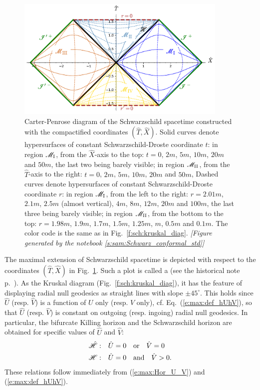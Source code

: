 \begin{figure}
\centerline{\includegraphics[width=0.9\textwidth]{max_carter-penrose-std.pdf}}
\caption[]{\label{f:max:carter-penrose-std} \footnotesize
Carter-Penrose diagram of the Schwarzschild spacetime
constructed with the compactified coordinates $(\hat{T},\hat{X})$.
Solid curves denote hypersurfaces of constant Schwarzschild-Droste coordinate
$t$: in region $\mathscr{M}_{\rm I}$, from the $\hat{X}$-axis to the top: $t=0$, $2m$,
$5m$, $10m$, $20m$ and $50m$, the last two being barely visible;
in region $\mathscr{M}_{\rm II}$, from the $\hat{T}$-axis
to the right: $t=0$, $2m$, $5m$, $10m$, $20m$ and $50m$,
Dashed curves denote hypersurfaces of constant Schwarzschild-Droste coordinate
$r$: in region $\mathscr{M}_{\rm I}$, from the left to the right: $r=2.01m$, $2.1m$, $2.5m$ (almost vertical), $4m$, $8m$, $12m$, $20m$ and $100m$, the last three being barely visible;
in region $\mathscr{M}_{\rm II}$, from the bottom to the top: $r=1.98m$, $1.9m$, $1.7m$,
$1.5m$, $1.25m$, $m$, $0.5m$ and $0.1m$.
The color code is the same as in Fig.~\ref{f:sch:kruskal_diag}.
\textsl{[Figure generated by the notebook \ref{s:sam:Schwarz_conformal_std}]}
}
\end{figure}

The maximal extension of Schwarzschild spacetime is depicted with respect
to the coordinates $(\hat{T},\hat{X})$ in Fig.~\ref{f:max:carter-penrose-std}.
Such a plot is called a 
(see the historical note p.~\pageref{h:max:CP-diag}).
As the Kruskal diagram (Fig.~\ref{f:sch:kruskal_diag}), it has the feature
of displaying radial null geodesics as straight lines with slope $\pm 45^\circ$.
This holds
since $\hat{U}$ (resp. $\hat{V}$) is a function of $U$ only
(resp. $V$ only), cf. Eq.~(\ref{e:max:def_hUhV}), so that $\hat{U}$
(resp. $\hat{V}$) is constant on outgoing (resp. ingoing) radial null geodesics.
In particular, the bifurcate Killing horizon and the Schwarzschild horizon
are obtained for specific values of $\hat{U}$ and $\hat{V}$:
\begin{subequations}
\begin{align}
    \hat{\mathscr{H}}:\quad&  \hat{U} = 0 \quad\mbox{or}\quad \hat{V} = 0 \\
    \mathscr{H}:\quad &  \hat{U} = 0 \quad\mbox{and}\quad \hat{V} > 0 .
\end{align}
\end{subequations}
These relations follow immediately from (\ref{e:max:Hor_U_V}) and
(\ref{e:max:def_hUhV}).

